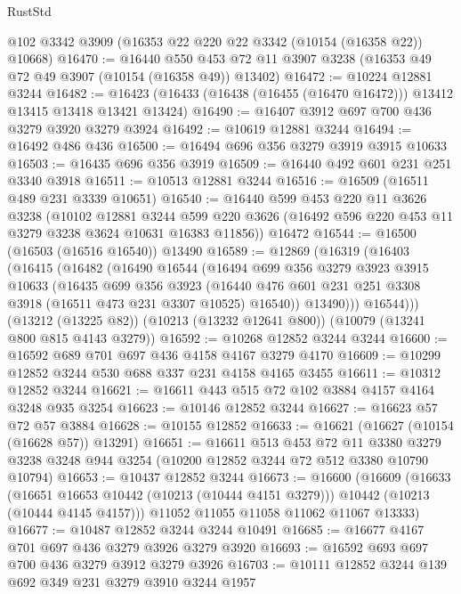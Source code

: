 \begin{lexlean}{RustStd}
\begin{coremodule}
    @102
    @3342
    @3909
    (@16353 @22 @220 @22 @3342 (@10154 (@16358 @22)) @10668)
@16470 := @16440
    @550
    @453
    @72
    @11
    @3907
    @3238
    (@16353 @49 @72 @49 @3907 (@10154 (@16358 @49)) @13402)
@16472 := @10224 @12881 @3244
@16482 := @16423 (@16433 (@16438 (@16455 (@16470 @16472))) @13412 @13415 @13418 @13421 @13424)
@16490 := @16407 @3912 @697 @700 @436 @3279 @3920 @3279 @3924
@16492 := @10619 @12881 @3244
@16494 := @16492 @486 @436
@16500 := @16494 @696 @356 @3279 @3919 @3915 @10633
@16503 := @16435 @696 @356 @3919
@16509 := @16440 @492 @601 @231 @251 @3340 @3918
@16511 := @10513 @12881 @3244
@16516 := @16509 (@16511 @489 @231 @3339 @10651)
@16540 := @16440
    @599
    @453
    @220
    @11
    @3626
    @3238
    (@10102
      @12881
      @3244
      @599
      @220
      @3626
      (@16492 @596 @220 @453 @11 @3279 @3238 @3624 @10631 @16383 @11856))
    @16472
@16544 := @16500 (@16503 (@16516 @16540)) @13490
@16589 := @12869
    (@16319
      (@16403
        (@16415
          (@16482
            (@16490
              @16544
              (@16494
                @699
                @356
                @3279
                @3923
                @3915
                @10633
                (@16435
                  @699
                  @356
                  @3923
                  (@16440 @476 @601 @231 @251 @3308 @3918 (@16511 @473 @231 @3307 @10525) @16540))
                @13490)))
          @16544)))
    (@13212 (@13225 @82))
    (@10213 (@13232 @12641 @800))
    (@10079 (@13241 @800 @815 @4143 @3279))
@16592 := @10268 @12852 @3244 @3244
@16600 := @16592 @689 @701 @697 @436 @4158 @4167 @3279 @4170
@16609 := @10299 @12852 @3244 @530 @688 @337 @231 @4158 @4165 @3455
@16611 := @10312 @12852 @3244
@16621 := @16611 @443 @515 @72 @102 @3884 @4157 @4164 @3248 @935 @3254
@16623 := @10146 @12852 @3244
@16627 := @16623 @57 @72 @57 @3884
@16628 := @10155 @12852
@16633 := @16621 (@16627 (@10154 (@16628 @57)) @13291)
@16651 := @16611
    @513
    @453
    @72
    @11
    @3380
    @3279
    @3238
    @3248
    @944
    @3254
    (@10200 @12852 @3244 @72 @512 @3380 @10790 @10794)
@16653 := @10437 @12852 @3244
@16673 := @16600
    (@16609
      (@16633
        (@16651 @16653 @10442 (@10213 (@10444 @4151 @3279)))
        @10442
        (@10213 (@10444 @4145 @4157)))
      @11052
      @11055
      @11058
      @11062
      @11067
      @13333)
@16677 := @10487 @12852 @3244 @3244 @10491
@16685 := @16677 @4167 @701 @697 @436 @3279 @3926 @3279 @3920
@16693 := @16592 @693 @697 @700 @436 @3279 @3912 @3279 @3926
@16703 := @10111 @12852 @3244 @139 @692 @349 @231 @3279 @3910 @3244 @1957

\end{coremodule}
\end{lexlean}
